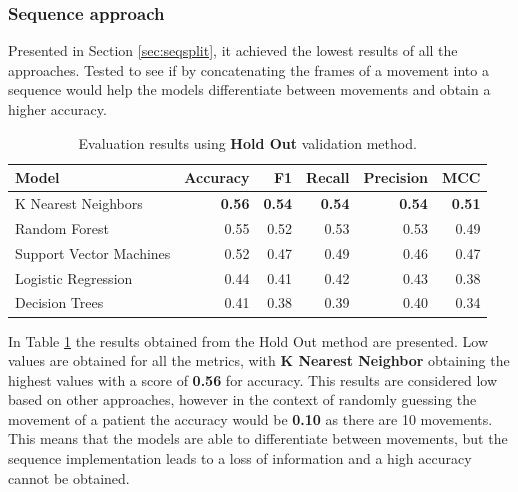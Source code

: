             \subsubsection{Sequence approach}

                Presented in Section \ref{sec:seqsplit}, it achieved the lowest results of all the approaches. Tested to see if by concatenating the frames of a movement into a sequence would help the models differentiate between movements and obtain a higher accuracy. 
                
                \begin{table}[htbp]
                    \centering
                    \begin{tabular}{lrrrrr}
                        \toprule
                        \textbf{Model} & \textbf{Accuracy} & \textbf{F1} & \textbf{Recall} & \textbf{Precision} & \textbf{MCC} \\
                        \midrule
                        K Nearest Neighbors & \textbf{0.56} & \textbf{0.54} & \textbf{0.54} & \textbf{0.54} & \textbf{0.51} \\
                        Random Forest & 0.55 & 0.52 & 0.53 & 0.53 & 0.49 \\
                        Support Vector Machines& 0.52 & 0.47 & 0.49 & 0.46 & 0.47 \\
                        Logistic Regression & 0.44 & 0.41 & 0.42 & 0.43 & 0.38 \\
                        Decision Trees & 0.41 & 0.38 & 0.39 & 0.40 & 0.34 \\
                        \bottomrule
                    \end{tabular}
                    \caption{Evaluation results using \textbf{Hold Out} validation method.}
                    \label{tab:sequence_approach_holdout}
                \end{table}

                In Table \ref{tab:sequence_approach_holdout} the results obtained from the Hold Out method are presented. Low values are obtained for all the metrics, with \textbf{K Nearest Neighbor} obtaining the highest values with a score of \textbf{0.56} for accuracy. This results are considered low based on other approaches, however in the context of randomly guessing the movement of a patient the accuracy would be \textbf{0.10} as there are 10 movements. This means that the models are able to differentiate between movements, but the sequence implementation leads to a loss of information and a high accuracy cannot be obtained.

